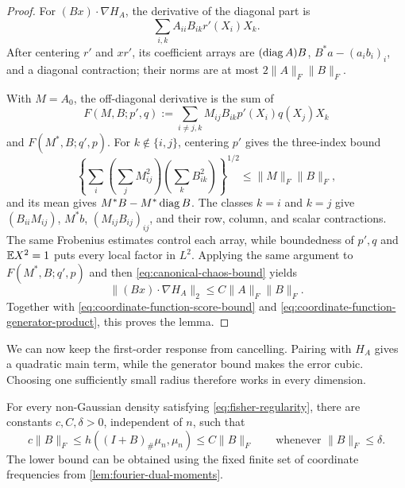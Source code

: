 \begin{proof}
For \((Bx)\cdot\nabla H_A\), the derivative of the diagonal part is
\[
 \sum_{i,k}A_{ii}B_{ik}r'(X_i)X_k.
\]
After centering \(r'\) and \(xr'\), its coefficient arrays are
\((\operatorname{diag} A)B\), \(B^*a-(a_i b_i)_i\), and a
diagonal contraction; their norms are at most
\(2\|A\|_F\|B\|_F\).

With \(M=A_0\), the off-diagonal derivative is the sum of
\[
 F(M,B;p',q):=
 \sum_{i\ne j,k}M_{ij}B_{ik}p'(X_i)q(X_j)X_k
\]
and \(F(M^*,B;q',p)\).  For \(k\notin\{i,j\}\), centering \(p'\) gives the
three-index bound
\[
 \left\{\sum_i\left(\sum_jM_{ij}^2\right)
                    \left(\sum_kB_{ik}^2\right)\right\}^{1/2}
 \le\|M\|_F\|B\|_F,
\]
and its mean gives \(M^*B-M^*\operatorname{diag} B\).  The classes \(k=i\) and \(k=j\)
give \((B_{ii}M_{ij})\), \(M^*b\), \((M_{ij}B_{ij})_{ij}\), and their
row, column, and scalar contractions.  The same Frobenius estimates control
each array, while boundedness of \(p',q\) and \(\mathbb E X^2=1\) puts every local
factor in \(L^2\).  Applying the same argument to \(F(M^*,B;q',p)\) and then
\eqref{eq:canonical-chaos-bound} yields
\[
 \|(Bx)\cdot\nabla H_A\|_2\le C\|A\|_F\|B\|_F.
\]
Together with \eqref{eq:coordinate-function-score-bound} and
\eqref{eq:coordinate-function-generator-product}, this proves the lemma.
\end{proof}

We can now keep the first-order response from cancelling. Pairing with
\(H_A\) gives a quadratic main term, while the generator bound makes the
error cubic. Choosing one sufficiently small radius therefore works in
every dimension.

\begin{proposition}
\label{prop:local-fisher-hellinger}
For every non-Gaussian density satisfying
\eqref{eq:fisher-regularity}, there are constants
$c,C,\delta>0$, independent of $n$, such that
\begin{equation}
 c\|B\|_F\le h((I+B)_\#\mu_n,\mu_n)
             \le C\|B\|_F
 \qquad\text{whenever }\|B\|_F\le\delta.
 \label{eq:local-matrix-hellinger}
\end{equation}
The lower bound can be obtained using the fixed finite set of
coordinate frequencies from \cref{lem:fourier-dual-moments}.
\end{proposition}

